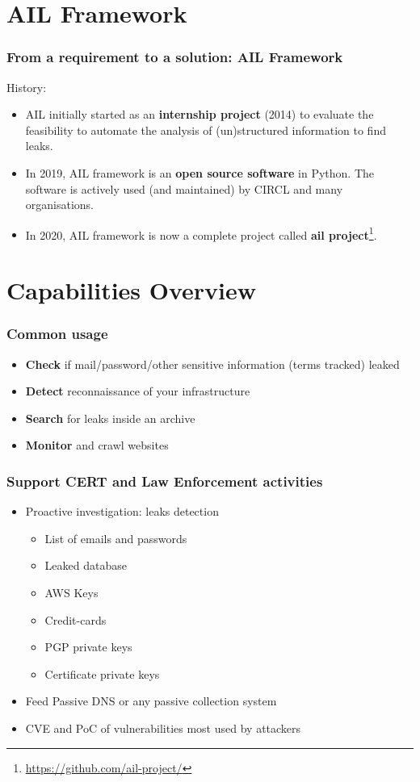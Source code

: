 \documentclass{beamer}
\begin{document}
\section{AIL Framework}
\begin{frame}
    \frametitle{From a requirement to a solution: AIL Framework}
    \large{History:}
    \begin{itemize}
        \item AIL initially started as an \textbf{internship project} (2014) to evaluate the feasibility to automate the analysis of (un)structured information to find leaks.
        \item In 2019, AIL framework is an \textbf{open source software} in Python. The software is actively used (and maintained) by CIRCL and many organisations.
        \item In 2020, AIL framework is now a complete project called \textbf{ail project}\footnote{\url{https://github.com/ail-project/}}.
    \end{itemize}
\end{frame}

\section{Capabilities Overview}

\begin{frame}
    \frametitle{Common usage}
        \begin{itemize}
                \item {\bf Check} if mail/password/other sensitive information (terms tracked) leaked
                \item {\bf Detect} reconnaissance of your infrastructure
                \item {\bf Search} for leaks inside an archive
                \item {\bf Monitor} and crawl websites
        \end{itemize}
\end{frame}

\begin{frame}
    \frametitle{Support CERT and Law Enforcement activities}
        \begin{itemize}
            \item Proactive investigation: leaks detection
            \begin{itemize}
		        \item List of emails and passwords
		        \item Leaked database
		        \item AWS Keys
		        \item Credit-cards
		        \item PGP private keys
		        \item Certificate private keys
		    \end{itemize}
		    \item Feed Passive DNS or any passive collection system
		    \item CVE and PoC of vulnerabilities most used by attackers
		\end{itemize}
\end{frame}
\end{document}
